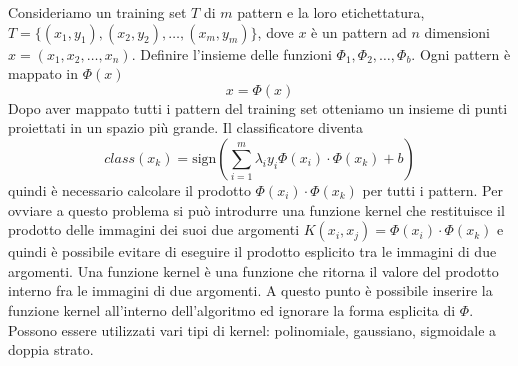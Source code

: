 \noindent Consideriamo un training set $T$ di $m$ pattern e la loro etichettatura,\\
 $T=\{ (x_1, y_1), (x_2, y_2), \dots, (x_m, y_m) \}$, dove $x$ è un pattern ad $n$ dimensioni $x  = (x_1, x_2, \dots, x_n)$. Definire l'insieme delle funzioni $\Phi_1, \Phi_2, \dots, \Phi_b $. Ogni pattern è mappato in $\Phi(x)$
\begin{equation}
x = \Phi(x)
\end{equation}
Dopo aver mappato tutti i pattern del training set otteniamo un insieme di punti proiettati in un spazio più grande. Il classificatore diventa
\begin{equation}
class(x_k) = \text{sign} \left( \sum_{i=1}^m \lambda_i y_i \Phi(x_i) \cdot \Phi(x_k) + b\right)
\end{equation}
quindi è necessario calcolare il prodotto $\Phi(x_i) \cdot \Phi(x_k)$ per tutti i pattern. Per ovviare a questo problema si può introdurre una funzione kernel che restituisce il prodotto delle immagini dei suoi due argomenti $K(x_i,x_j) = \Phi(x_i) \cdot \Phi(x_k)$ e quindi è possibile evitare di eseguire il prodotto esplicito tra le immagini di due argomenti. Una funzione kernel è una funzione che ritorna il valore del prodotto interno fra le immagini di due argomenti. A questo punto è possibile inserire la funzione kernel all'interno dell'algoritmo ed ignorare la forma esplicita di $\Phi$. Possono essere utilizzati vari tipi di kernel: polinomiale, gaussiano, sigmoidale a doppia strato. 


%
